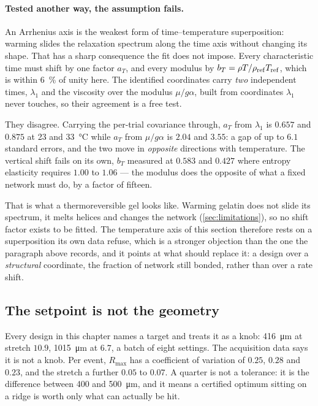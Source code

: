\documentclass[10pt]{article}
\begin{document}
\paragraph{Tested another way, the assumption fails.} An Arrhenius axis is the weakest form of
time--temperature superposition: warming slides the relaxation spectrum along the time axis
without changing its shape. That has a sharp consequence the fit does not impose. Every
characteristic time must shift by one factor $a_T$, and every modulus by
$b_T = \rho T/\rho_{\rm ref}T_{\rm ref}$, which is within \SI{6}{\percent} of unity here. The
identified coordinates carry \emph{two} independent times, $\lambda_1$ and the viscosity over the
modulus $\mu/g\alpha$, built from coordinates $\lambda_1$ never touches, so their agreement is a
free test.

They disagree. Carrying the per-trial covariance through, $a_T$ from $\lambda_1$ is $0.657$ and
$0.875$ at \SI{23}{} and \SI{33}{\celsius} while $a_T$ from $\mu/g\alpha$ is $2.04$ and $3.55$:
a gap of up to $6.1$ standard errors, and the two move in \emph{opposite} directions with
temperature. The vertical shift fails on its own, $b_T$ measured at $0.583$ and $0.427$ where
entropy elasticity requires $1.00$ to $1.06$ --- the modulus does the opposite of what a fixed
network must do, by a factor of fifteen.

That is what a thermoreversible gel looks like. Warming gelatin does not slide its spectrum, it
melts helices and changes the network (\cref{sec:limitations}), so no shift factor exists to be
fitted. The temperature axis of this section therefore rests on a superposition its own data
refuse, which is a stronger objection than the one the paragraph above records, and it points at
what should replace it: a design over a \emph{structural} coordinate, the fraction of network
still bonded, rather than over a rate shift.

\subsection*{The setpoint is not the geometry}
\label{sec:setpoint}

Every design in this chapter names a target and treats it as a knob: \SI{416}{\micro\metre} at
stretch $10.9$, \SI{1015}{\micro\metre} at $6.7$, a batch of eight settings. The acquisition data
says it is not a knob. Per event, $R_{\max}$ has a coefficient of variation of $0.25$, $0.28$ and
$0.23$, and the stretch a further $0.05$ to $0.07$. A quarter is not a tolerance: it is the
difference between \SI{400}{} and \SI{500}{\micro\metre}, and it means a certified optimum sitting
on a ridge is worth only what can actually be hit.
\end{document}
